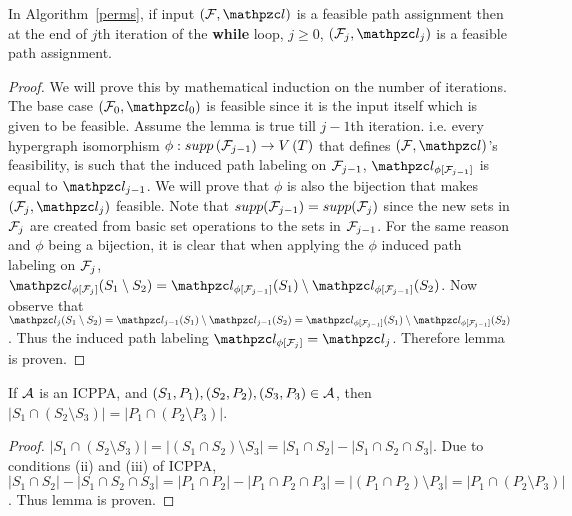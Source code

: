 \begin{lemma}
  \label{lem:feasible}
  In Algorithm~\ref{perms}, if input $(\cF, \cl)$ is a feasible path
  assignment then at the end of $j$th iteration of the {\bf while}
  loop, $j \ge 0$, $(\cF_j, \cl_j)$ is a feasible path assignment.
\end{lemma}
\begin{proof}%
  We will prove this by mathematical induction on the number of
  iterations. The base case $(\cF_0, \cl_0)$ is feasible since it is
  the input itself which is given to be feasible. Assume the lemma is
  true till $j-1$th iteration. i.e. every hypergraph isomorphism
  $\phi: supp\left({\cal F}_{j-1}\right) \rightarrow V\left(T \right)$ that
  defines $(\cF, \cl)$'s feasibility, is such that the induced path
  labeling on ${\cal F}_{j-1}$, $\cl_{\phi[{\cF_{j-1}}]}$ is equal to
  $\cl_{j-1}$. We will prove that $\phi$ is also the bijection that
  makes $(\cF_j, \cl_j)$ feasible. Note that $supp({\cal F}_{j-1}) =
  supp({\cal F}_{j})$ since the new sets in ${\cal F}_j$ are created from basic
  set operations to the sets in ${\cal F}_{j-1}$. For the same reason and
  $\phi$ being a bijection, it is clear that when applying the $\phi$
  induced path labeling on ${\cal F}_j$, $ \cl_{\phi[{\cF_{j}}]}(S_1
  \setminus S_2) = \cl_{\phi[{\cF_{j-1}}]}(S_1) \setminus
  \cl_{\phi[{\cF_{j-1}}]}(S_2)$. Now observe that $ \cl_j(S_1
  \setminus S_2) = \cl_{j-1}(S_1) \setminus \cl_{j-1}(S_2) =
  \cl_{\phi[{\cF_{j-1}}]}(S_1) \setminus
  \cl_{\phi[{\cF_{j-1}}]}(S_2)$. Thus the induced path labeling
  $\cl_{\phi[{\cF_{j}}]} = \cl_{j}$. Therefore lemma is proven.  %
\end{proof}




\begin{lemma}
  \label{lem:setminuscard}
  If ${\cal A}$ is an ICPPA, and $(S_1, P_1),(S_2, P_2),(S_3, P_3) \in
  {\cal A}$, then $|S_1 \cap (S_2 \setminus S_3)| = |P_1 \cap (P_2
  \setminus P_3)|$.
\end{lemma}
\begin{proof}
  $|S_1 \cap (S_2 \setminus S_3)| = |(S_1 \cap S_2) \setminus S_3| =
  |S_1 \cap S_2| - |S_1 \cap S_2 \cap S_3|$. Due to conditions (ii)
  and (iii) of ICPPA, $|S_1 \cap S_2| - |S_1 \cap S_2 \cap S_3| = |P_1
  \cap P_2| - |P_1 \cap P_2 \cap P_3| = |(P_1 \cap P_2) \setminus P_3|
  = |P_1 \cap (P_2 \setminus P_3)|$. Thus lemma is proven. %
\end{proof}


